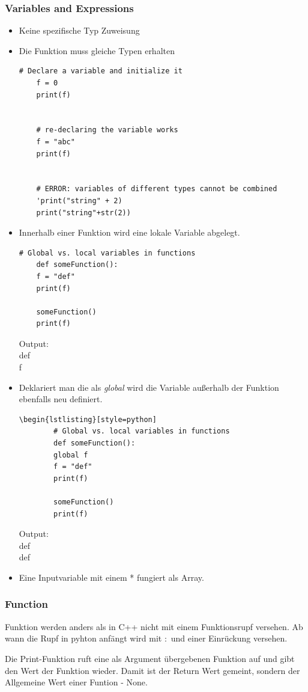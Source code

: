 \subsubsection{Variables and Expressions}
\begin{itemize}
\item Keine spezifische Typ Zuweisung
\item Die  Funktion muss gleiche Typen erhalten
\begin{lstlisting}[style=python]
	# Declare a variable and initialize it
	f = 0
	print(f)
	
	
	# re-declaring the variable works
	f = "abc"
	print(f)
	
	
	# ERROR: variables of different types cannot be combined
	'print("string" + 2)
	print("string"+str(2))
\end{lstlisting}
\item Innerhalb einer Funktion wird eine lokale Variable abgelegt.
\begin{lstlisting}[style=python]
	# Global vs. local variables in functions
	def someFunction():
	f = "def"
	print(f)
	
	someFunction()
	print(f)
\end{lstlisting}
Output:\\
def\\
f
\item Deklariert man die als \textit{global} wird die Variable außerhalb der Funktion ebenfalls neu definiert.
\begin{lstlisting}[style=python]
	\begin{lstlisting}[style=python]
		# Global vs. local variables in functions
		def someFunction():
		global f
		f = "def"
		print(f)
		
		someFunction()
		print(f)
	\end{lstlisting}
	Output:\\
	def\\
	def
	\item Eine Inputvariable mit einem * fungiert als Array.
\end{itemize}
\subsubsection{Function}
Funktion werden anders als in C++ nicht mit einem Funktionsrupf versehen. Ab wann die Rupf in pyhton anfängt wird mit $:$ und einer Einrückung versehen.

Die Print-Funktion ruft eine als Argument übergebenen Funktion auf und gibt den Wert der Funktion wieder. Damit ist der Return Wert gemeint, sondern der Allgemeine Wert einer Funtion - None.

